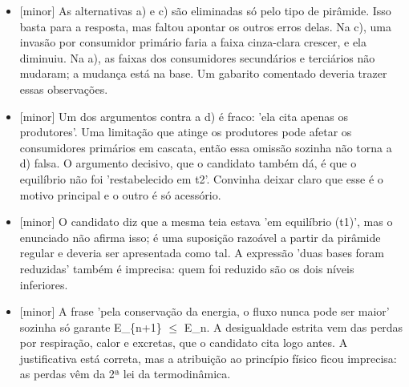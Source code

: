 \documentclass{article}%
\begin{document}
\begin{itemize}%
\item%
{[}minor{]} As alternativas a) e c) são eliminadas só pelo tipo de pirâmide. Isso basta para a resposta, mas faltou apontar os outros erros delas. Na c), uma invasão por consumidor primário faria a faixa cinza{-}clara crescer, e ela diminuiu. Na a), as faixas dos consumidores secundários e terciários não mudaram; a mudança está na base. Um gabarito comentado deveria trazer essas observações.%
\item%
{[}minor{]} Um dos argumentos contra a d) é fraco: 'ela cita apenas os produtores'. Uma limitação que atinge os produtores pode afetar os consumidores primários em cascata, então essa omissão sozinha não torna a d) falsa. O argumento decisivo, que o candidato também dá, é que o equilíbrio não foi 'restabelecido em t2'. Convinha deixar claro que esse é o motivo principal e o outro é só acessório.%
\item%
{[}minor{]} O candidato diz que a mesma teia estava 'em equilíbrio (t1)', mas o enunciado não afirma isso; é uma suposição razoável a partir da pirâmide regular e deveria ser apresentada como tal. A expressão 'duas bases foram reduzidas' também é imprecisa: quem foi reduzido são os dois níveis inferiores.%
\item%
{[}minor{]} A frase 'pela conservação da energia, o fluxo nunca pode ser maior' sozinha só garante E\_\{n+1\} $\leq$ E\_n. A desigualdade estrita vem das perdas por respiração, calor e excretas, que o candidato cita logo antes. A justificativa está correta, mas a atribuição ao princípio físico ficou imprecisa: as perdas vêm da 2ª lei da termodinâmica.%
\end{itemize}%
\end{document}

